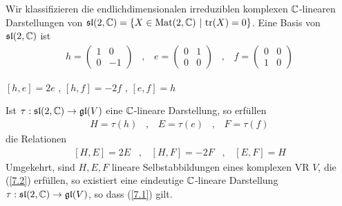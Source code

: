 \begin{theorem}
    Wir klassifizieren die endlichdimensionalen irreduziblen komplexen
    $\mathbb{C}$-linearen Darstellungen von $\mathfrak{sl}(2,\mathbb{C}) = \left\{ 
    X \in \text{Mat}(2,\mathbb{C}) \ | \ \text{tr}(X) = 0 \right\}$. Eine Basis von $\mathfrak{sl}(2,\mathbb{C})$ ist
    \begin{align*}
        h = \begin{pmatrix}
            1 & 0 \\ 0 & -1
        \end{pmatrix}
        \hspace{10pt} , \hspace{10pt}
        e = \begin{pmatrix}
            0 & 1 \\ 0 & 0
        \end{pmatrix}
        \hspace{10pt} , \hspace{10pt}
        f = \begin{pmatrix}
            0 & 0 \\ 1 & 0
        \end{pmatrix}
    \end{align*} 
\end{theorem}

\begin{lemma}
    $[h,e] = 2e$ , $[h,f] = -2f$ , $[e,f] = h$
\end{lemma}

\begin{korollar}
    Ist $\tau: \mathfrak{sl}(2,\mathbb{C}) \rightarrow \mathfrak{gl}(V)$ eine $\mathbb{C}$-lineare Darstellung,
    so erfüllen
    \begin{align}\label{7.1}
        H = \tau(h)
        \hspace{10pt} , \hspace{10pt}
        E = \tau(e)
        \hspace{10pt} , \hspace{10pt}
        F = \tau(f)
    \end{align}
    die Relationen
    \begin{align}\label{7.2}
        [H,E] = 2 E
        \hspace{10pt} , \hspace{10pt}
        [H,F] = -2F
        \hspace{10pt} , \hspace{10pt}
        [E,F] = H
    \end{align}
    Umgekehrt, sind $H,E,F$ lineare Selbstabbildungen eines komplexen VR $V$,
    die (\ref{7.2}) erfüllen, so existiert eine eindeutige $\mathbb{C}$-lineare
    Darstellung $\tau: \mathfrak{sl}(2,\mathbb{C}) \rightarrow \mathfrak{gl}(V)$, so dass (\ref{7.1}) gilt.
\end{korollar}

